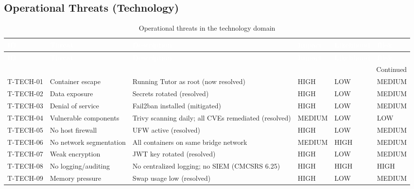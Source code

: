 \subsection{Operational Threats (Technology)}
\begin{center}
\begin{longtable}{|p{}|p{}|p{}|p{}|p{}|p{}|}
\caption[Operational Threats]{Operational threats in the technology domain}
\label{tab:operational-threats} \\
\hline
\rowcolor{mooveblue}
\textcolor{white}{\textbf{ID}} & \textcolor{white}{\textbf{Threat}} & \textcolor{white}{\textbf{Description}} & \textcolor{white}{\textbf{Impact}} & \textcolor{white}{\textbf{Likelihood}} & \textcolor{white}{\textbf{Risk}} \\
\hline
\endfirsthead
\hline
\rowcolor{mooveblue}
\textcolor{white}{\textbf{ID}} & \textcolor{white}{\textbf{Threat}} & \textcolor{white}{\textbf{Description}} & \textcolor{white}{\textbf{Impact}} & \textcolor{white}{\textbf{Likelihood}} & \textcolor{white}{\textbf{Risk}} \\
\hline
\endhead
\hline
\multicolumn{6}{|r|}{Continued} \\
\hline
\endfoot
\hline
\endlastfoot
T-TECH-01 & Container escape & Running Tutor as root (now resolved) & HIGH & LOW & MEDIUM \\
T-TECH-02 & Data exposure & Secrets rotated (resolved) & HIGH & LOW & MEDIUM \\
T-TECH-03 & Denial of service & Fail2ban installed (mitigated) & HIGH & LOW & MEDIUM \\
T-TECH-04 & Vulnerable components & Trivy scanning daily; all CVEs remediated (resolved) & MEDIUM & LOW & LOW \\
T-TECH-05 & No host firewall & UFW active (resolved) & HIGH & LOW & MEDIUM \\
T-TECH-06 & No network segmentation & All containers on same bridge network & MEDIUM & HIGH & MEDIUM \\
T-TECH-07 & Weak encryption & JWT key rotated (resolved) & HIGH & LOW & MEDIUM \\
T-TECH-08 & No logging/auditing & No centralized logging; no SIEM (CMCSRS 6.25) & HIGH & HIGH & HIGH \\
T-TECH-09 & Memory pressure & Swap usage low (resolved) & HIGH & LOW & MEDIUM \\
\hline
\end{longtable}
\end{center}

